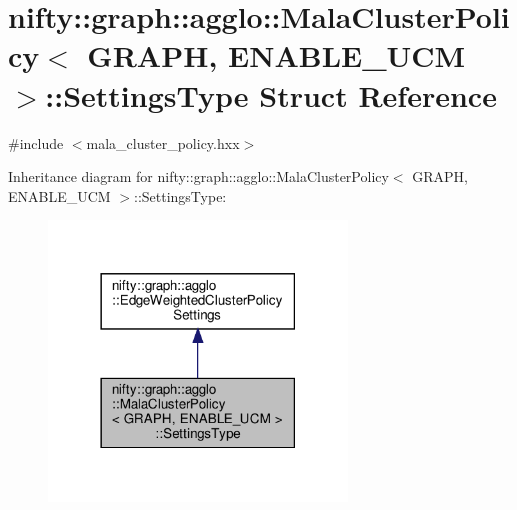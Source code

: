 \hypertarget{structnifty_1_1graph_1_1agglo_1_1MalaClusterPolicy_1_1SettingsType}{}\section{nifty\+:\+:graph\+:\+:agglo\+:\+:Mala\+Cluster\+Policy$<$ G\+R\+A\+PH, E\+N\+A\+B\+L\+E\+\_\+\+U\+CM $>$\+:\+:Settings\+Type Struct Reference}
\label{structnifty_1_1graph_1_1agglo_1_1MalaClusterPolicy_1_1SettingsType}


{\ttfamily \#include $<$mala\+\_\+cluster\+\_\+policy.\+hxx$>$}



Inheritance diagram for nifty\+:\+:graph\+:\+:agglo\+:\+:Mala\+Cluster\+Policy$<$ G\+R\+A\+PH, E\+N\+A\+B\+L\+E\+\_\+\+U\+CM $>$\+:\+:Settings\+Type\+:
\nopagebreak
\begin{figure}[H]
\begin{center}
\leavevmode
\includegraphics[width=225pt]{structnifty_1_1graph_1_1agglo_1_1MalaClusterPolicy_1_1SettingsType__inherit__graph}
\end{center}
\end{figure}


